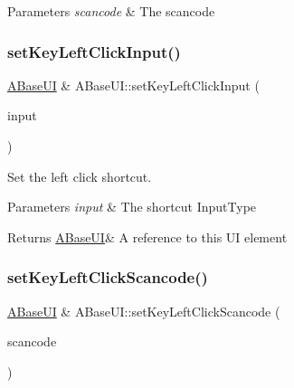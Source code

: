 \begin{DoxyParams}{Parameters}
{\em scancode} & The scancode \\
\hline
\end{DoxyParams}
\mbox{\label{class_a_base_u_i_a2a2b600c735d45f2ea2c14291a5292ba}} 
\subsubsection{\texorpdfstring{set\+Key\+Left\+Click\+Input()}{setKeyLeftClickInput()}}
{\footnotesize\ttfamily \hyperlink{class_a_base_u_i}{A\+Base\+UI} \& A\+Base\+U\+I\+::set\+Key\+Left\+Click\+Input (\begin{DoxyParamCaption}\item[{Input\+Type\+::\+Enum}]{input }\end{DoxyParamCaption})\hspace{0.3cm}{\ttfamily [virtual]}}



Set the left click shortcut. 


\begin{DoxyParams}{Parameters}
{\em input} & The shortcut Input\+Type \\
\hline
\end{DoxyParams}
\begin{DoxyReturn}{Returns}
\hyperlink{class_a_base_u_i}{A\+Base\+UI}\& A reference to this UI element 
\end{DoxyReturn}
\mbox{\label{class_a_base_u_i_aba668d6b9c8bf7e1e0b94dfb0b6aaab1}} 
\subsubsection{\texorpdfstring{set\+Key\+Left\+Click\+Scancode()}{setKeyLeftClickScancode()}}
{\footnotesize\ttfamily \hyperlink{class_a_base_u_i}{A\+Base\+UI} \& A\+Base\+U\+I\+::set\+Key\+Left\+Click\+Scancode (\begin{DoxyParamCaption}\item[{S\+D\+L\+\_\+\+Scancode}]{scancode }\end{DoxyParamCaption})\hspace{0.3cm}{\ttfamily [virtual]}}



